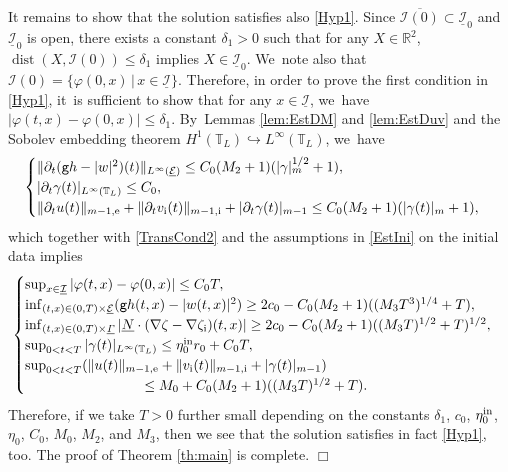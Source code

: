 \documentclass[10pt]{amsart}
\newcommand{\gr}{{\mathtt g}}
\newcommand{\R}{{\mathbb R}}
\newcommand{\dt}{\partial_t}
\newcommand{\cI}{{\mathcal I}}
\newcommand{\cE}{{\mathcal E}}
\newcommand{\ul}[1]{\underline{#1}}
\newcommand{\itGamma}{\mathit{\Gamma}}
\theoremstyle{definition}
\begin{document}
It remains to show that the solution satisfies also \eqref{Hyp1}.
Since $\overline{\cI(0)} \subset \ul{\cI}_0$ and $\ul{\cI}_0$ is open, there exists a constant $\delta_1>0$ such that for any $X\in\R^2$,
$\operatorname{dist}(X,\cI(0))\leq\delta_1$ implies $X\in\ul{\cI}_0$. We~note also that $\cI(0)=\{ \varphi(0,x) \,|\, x\in\ul{\cI} \}$.
Therefore, in order to prove the first condition in \eqref{Hyp1}, it~is sufficient to show that for any $x\in\ul{\cI}$, we~have $|\varphi(t,x)-\varphi(0,x)|\leq\delta_1$. By~Lemmas \ref{lem:EstDM} and \ref{lem:EstDuv} and the Sobolev embedding theorem $H^1(\mathbb{T}_L) \hookrightarrow L^\infty(\mathbb{T}_L)$, we~have
\[
\begin{cases}
\|\dt(\gr h-|w|^2)(t)\|_{L^\infty(\ul{\cE})} \leq C_0(M_2+1)(|\gamma|_m^{1/2}+1), \\
|\dt\gamma(t)|_{L^\infty(\mathbb{T}_L)} \leq C_0, \\
\|\dt u(t)\|_{m-1,{\rm e}}+\|\dt v_\mathrm{i}(t)\|_{m-1,{\rm i}}+|\dt\gamma(t)|_{m-1} \leq C_0(M_2+1)(|\gamma(t)|_m+1),
\end{cases}
\]
which together with \eqref{TransCond2} and the assumptions in \eqref{EstIni} on the initial data implies
\[
\begin{cases}
\sup_{x\in\ul{\cI}}|\varphi(t,x)-\varphi(0,x)| \leq C_0T, \\
\inf_{(t,x)\in(0,T)\times\ul{\cE}}(\gr h(t,x)-|w(t,x)|^2) \geq 2c_0 - C_0(M_2+1)((M_3T^3)^{1/4}+T), \\
\inf_{(t,x)\in(0,T)\times\ul{\itGamma}}| \ul{N}\cdot(\nabla\zeta-\nabla\zeta_\mathrm{i})(t,x)| \geq 2c_0 - C_0(M_2+1)((M_3T)^{1/2}+T)^{1/2}, \\
\sup_{0<t<T}|\gamma(t)|_{L^\infty(\mathbb{T}_L)} \leq \eta_0^{\rm in}r_0 + C_0T, \\
\sup_{0<t<T}(\|u(t)\|_{m-1,{\rm e}} + \|v_\mathrm{i}(t)\|_{m-1,{\rm i}} + |\gamma(t)|_{m-1}) \\
\hspace{3cm}\leq M_0 + C_0(M_2+1)((M_3T)^{1/2}+T).
\end{cases}
\]
Therefore, if we take $T>0$ further small depending on the constants $\delta_1$, $c_0$, $\eta_0^{\rm in}$, $\eta_0$, $C_0$, $M_0$, $M_2$, and $M_3$,
then we see that the solution satisfies in fact \eqref{Hyp1}, too.
The proof of Theorem \ref{th:main} is complete.
\hfill$\Box$
\end{document}
